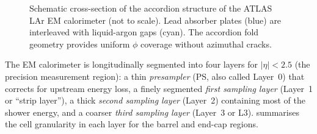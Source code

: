 \documentclass[11pt,a4paper]{article}
\newcommand{\abseta}{|\eta|}
\begin{document}
\begin{figure}[htbp]
  \centering
  \caption{Schematic cross-section of the accordion structure of the
           ATLAS LAr EM calorimeter (not to scale).  Lead absorber
           plates (blue) are interleaved with liquid-argon gaps
           (cyan).  The accordion fold geometry provides uniform
           $\phi$ coverage without azimuthal cracks.}
  \label{fig:accordion}
\end{figure}

The EM calorimeter is longitudinally segmented into four layers for
$\abseta < 2.5$ (the precision measurement region):
a thin \emph{presampler} (PS, also called Layer~0) that corrects
for upstream energy loss, a finely segmented \emph{first sampling
layer} (Layer~1 or ``strip layer''), a thick \emph{second sampling
layer} (Layer~2) containing most of the shower energy, and a
coarser \emph{third sampling layer} (Layer~3 or L3).
 summarises the cell granularity in each
layer for the barrel and end-cap regions.
\end{document}
